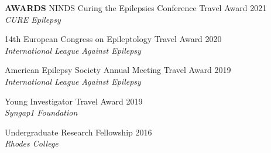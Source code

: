 \documentclass{resume} %
\begin{document}
   

\begin{rSection}{{\bfseries AWARDS}}
    NINDS Curing the Epilepsies Conference Travel Award \hfill {2021}
    \\ \emph{CURE Epilepsy} 
   
   14th European Congress on Epileptology Travel Award \hfill{2020}
   \\ \emph{International League Against Epilepsy}
   
   American Epilepsy Society Annual Meeting Travel Award \hfill{2019}
   \\ \emph{International League Against Epilepsy}
   
   Young Investigator Travel Award \hfill{2019}
   \\ \emph{Syngap1 Foundation}
   
   Undergraduate Research Fellowship \hfill{2016}
   \\ \emph{Rhodes College}
       \end{rSection}
\end{document}
